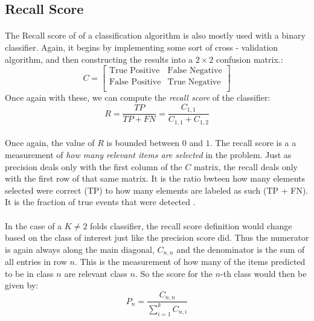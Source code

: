 \documentclass[12pt,letterpaper]{article}
\begin{document}

\subsection{Recall Score}
\paragraph*{}The Recall score of of a classification algorithm is also mostly used with a binary classifier. Again, it begins by implementing some sort of cross - validation algorithm, and then constructing the results into a $2 \times 2$ confusion matrix.:
\begin{equation}
C = 
\begin{bmatrix}
\text{True Positive} & \text{False Negative} \\
\text{False Positive} & \text{True Negative} \\
\end{bmatrix}
\end{equation}
Once again with these, we can compute the \textit{recall score} of the classifier:
\begin{equation}
\label{recall score}
R = \frac{TP}{TP + FN} = \frac{C_{1,1}}{C_{1,1}+C_{1,2}}
\end{equation}
\paragraph*{}Once again, the value of $R$ is bounded between $0$ and $1$. The recall score is a a measurement of \textit{how many relevant items are selected} in the problem. Just as precision deals only with the first column of the $C$ matrix, the recall deals only with the first row of that same matrix. It is the ratio bwteen how many elements selected were correct (TP) to how many elements are labeled as such (TP + FN). It is the fraction of true events that were detected \cite{Goodfellow}.
\paragraph*{}In the case of a $K \neq 2$ folds classifier, the recall score definition would change based on the class of interest just like the precision score did. Thus the numerator is again always along the main diagonal, $C_{n,n}$ and the denominator is the sum of all entries in row $n$. This is the measurement of how many of the items predicted to be in class $n$ are relevant class $n$. So the score for the $n$-th class would then be given by:
\begin{equation}
P_n = \frac{C_{n,n}}{\sum_{i=1}^{k}C_{n,i}}
\end{equation}
\end{document}
